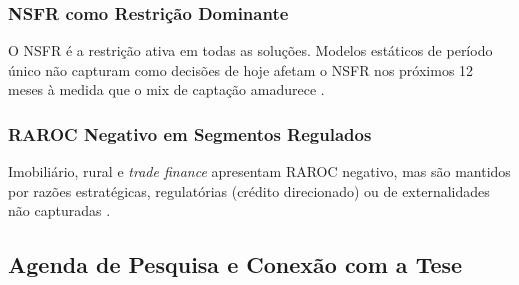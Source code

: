 \documentclass[12pt, a4paper, oneside]{article}
\begin{document}
\subsubsection{NSFR como Restrição Dominante}

O NSFR é a restrição ativa em todas as soluções. Modelos estáticos de período
único não capturam como decisões de hoje afetam o NSFR nos próximos 12 meses
à medida que o mix de captação amadurece \citep{KoussisPadgett2016}.

\subsubsection{RAROC Negativo em Segmentos Regulados}

Imobiliário, rural e \textit{trade finance} apresentam RAROC negativo, mas
são mantidos por razões estratégicas, regulatórias (crédito direcionado) ou
de externalidades não capturadas \citep{Bonomo2016,Coelho2012}.

\subsection{Agenda de Pesquisa e Conexão com a Tese}
\end{document}
